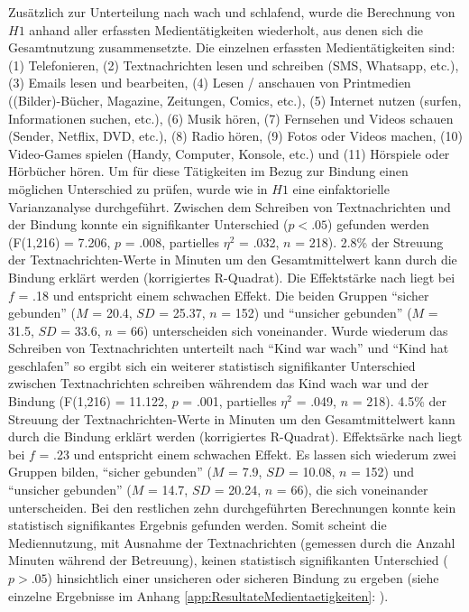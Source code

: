 Zusätzlich zur Unterteilung nach wach und schlafend, wurde die Berechnung von $H1$  anhand aller erfassten Medientätigkeiten wiederholt, aus denen sich die Gesamtnutzung zusammensetzte. Die einzelnen erfassten Medientätigkeiten sind: (1) Telefonieren,  (2) Textnachrichten lesen und schreiben (SMS, Whatsapp, etc.), (3) Emails lesen und bearbeiten, (4) Lesen / anschauen von Printmedien ((Bilder)-Bücher, Magazine, Zeitungen, Comics, etc.), (5) Internet nutzen (surfen, Informationen suchen, etc.), (6) Musik hören, (7) Fernsehen und Videos schauen (Sender, Netflix, DVD, etc.), (8) Radio hören, (9) Fotos oder Videos machen, (10) Video-Games spielen (Handy, Computer, Konsole, etc.) und (11) Hörspiele oder Hörbücher hören. Um für diese Tätigkeiten im Bezug zur Bindung einen möglichen Unterschied zu prüfen, wurde wie in $H1$ eine einfaktorielle Varianzanalyse durchgeführt. Zwischen dem Schreiben von Textnachrichten und der Bindung konnte ein signifikanter Unterschied ($p<.05$) gefunden werden (F(1,216) = 7.206, $p$ = .008, partielles $\eta^2$ = .032, $n$ = 218). 2.8\% der Streuung der Textnachrichten-Werte in Minuten um den Gesamtmittelwert kann durch die Bindung erklärt werden (korrigiertes R-Quadrat). Die Effektstärke nach  liegt bei $f$ = .18 und entspricht einem schwachen Effekt. Die beiden Gruppen \enquote{sicher gebunden} ($M$ = 20.4, $SD$ = 25.37, $n$ = 152) und \enquote{unsicher gebunden} ($M$ = 31.5, $SD$ = 33.6, $n$ = 66) unterscheiden sich voneinander. Wurde wiederum das Schreiben von Textnachrichten unterteilt nach \enquote{Kind war wach} und \enquote{Kind hat geschlafen} so ergibt sich ein weiterer statistisch signifikanter Unterschied zwischen Textnachrichten schreiben währendem das Kind wach war und der Bindung (F(1,216) = 11.122, $p$ = .001, partielles $\eta^2$ = .049, $n$ = 218). 4.5\% der Streuung der Textnachrichten-Werte in Minuten um den Gesamtmittelwert kann durch die Bindung erklärt werden (korrigiertes R-Quadrat). Effektsärke nach  liegt bei $f$ = .23 und entspricht einem schwachen Effekt. Es lassen sich wiederum zwei Gruppen bilden, \enquote{sicher gebunden} ($M$ = 7.9, $SD$ = 10.08, $n$ = 152) und \enquote{unsicher gebunden} ($M$ = 14.7, $SD$ = 20.24, $n$ = 66), die sich voneinander unterscheiden. Bei den restlichen zehn durchgeführten Berechnungen konnte kein statistisch signifikantes Ergebnis gefunden werden. Somit scheint die Mediennutzung, mit Ausnahme der Textnachrichten (gemessen durch die Anzahl Minuten während der Betreuung), keinen statistisch signifikanten Unterschied ($p > .05$) hinsichtlich einer unsicheren oder sicheren Bindung zu ergeben (siehe einzelne Ergebnisse im Anhang \ref{app:ResultateMedientaetigkeiten}: \textit{}).

